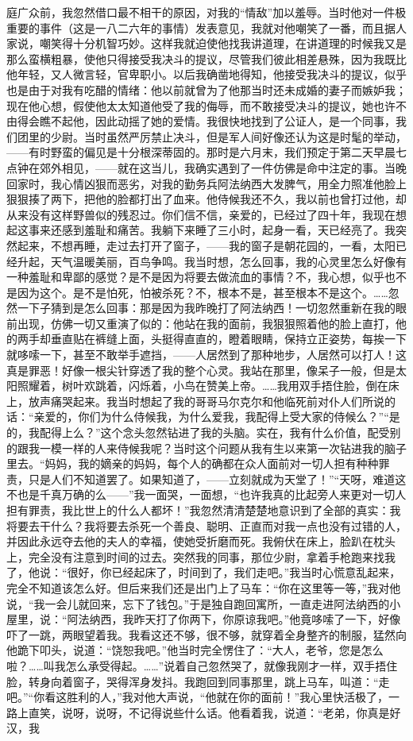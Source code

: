 庭广众前，我忽然借口最不相干的原因，对我的“情敌”加以羞辱。当时他对一件极重要的事件（这是一八二六年的事情）发表意见，我就对他嘲笑了一番，而且据人家说，嘲笑得十分机智巧妙。这样我就迫使他找我讲道理，在讲道理的时候我又是那么蛮横粗暴，使他只得接受我决斗的提议，尽管我们彼此相差悬殊，因为我既比他年轻，又人微言轻，官卑职小。以后我确凿地得知，他接受我决斗的提议，似乎也是由于对我有吃醋的情绪：他以前就曾为了他那当时还未成婚的妻子而嫉妒我；现在他心想，假使他太太知道他受了我的侮辱，而不敢接受决斗的提议，她也许不由得会瞧不起他，因此动摇了她的爱情。我很快地找到了公证人，是一个同事，我们团里的少尉。当时虽然严厉禁止决斗，但是军人间好像还认为这是时髦的举动，——有时野蛮的偏见是十分根深蒂固的。那时是六月末，我们预定于第二天早晨七点钟在郊外相见，——就在这当儿，我确实遇到了一件仿佛是命中注定的事。当晚回家时，我心情凶狠而恶劣，对我的勤务兵阿法纳西大发脾气，用全力照准他脸上狠狠揍了两下，把他的脸都打出了血来。他侍候我还不久，我以前也曾打过他，却从来没有这样野兽似的残忍过。你们信不信，亲爱的，已经过了四十年，我现在想起这事来还感到羞耻和痛苦。我躺下来睡了三小时，起身一看，天已经亮了。我突然起来，不想再睡，走过去打开了窗子，——我的窗子是朝花园的，一看，太阳已经升起，天气温暖美丽，百鸟争鸣。我当时想，怎么回事，我的心灵里怎么好像有一种羞耻和卑鄙的感觉？是不是因为将要去做流血的事情？不，我心想，似乎也不是因为这个。是不是怕死，怕被杀死？不，根本不是，甚至根本不是这个。……忽然一下子猜到是怎么回事：那是因为我昨晚打了阿法纳西！一切忽然重新在我的眼前出现，仿佛一切又重演了似的：他站在我的面前，我狠狠照着他的脸上直打，他的两手却垂直贴在裤缝上面，头挺得直直的，瞪着眼睛，保持立正姿势，每挨一下就哆嗦一下，甚至不敢举手遮挡，——人居然到了那种地步，人居然可以打人！这真是罪恶！好像一根尖针穿透了我的整个心灵。我站在那里，像呆子一般，但是太阳照耀着，树叶欢跳着，闪烁着，小鸟在赞美上帝。……我用双手捂住脸，倒在床上，放声痛哭起来。我当时想起了我的哥哥马尔克尔和他临死前对仆人们所说的话：“亲爱的，你们为什么侍候我，为什么爱我，我配得上受大家的侍候么？”“是的，我配得上么？”这个念头忽然钻进了我的头脑。实在，我有什么价值，配受别的跟我一模一样的人来侍候我呢？当时这个问题从我有生以来第一次钻进我的脑子里去。“妈妈，我的嫡亲的妈妈，每个人的确都在众人面前对一切人担有种种罪责，只是人们不知道罢了。如果知道了，——立刻就成为天堂了！”“天呀，难道这不也是千真万确的么——”我一面哭，一面想，“也许我真的比起旁人来更对一切人担有罪责，我比世上的什么人都坏！”我忽然清清楚楚地意识到了全部的真实：我将要去干什么？我将要去杀死一个善良、聪明、正直而对我一点也没有过错的人，并因此永远夺去他的夫人的幸福，使她受折磨而死。我俯伏在床上，脸趴在枕头上，完全没有注意到时间的过去。突然我的同事，那位少尉，拿着手枪跑来找我了，他说：“很好，你已经起床了，时间到了，我们走吧。”我当时心慌意乱起来，完全不知道该怎么好。但后来我们还是出门上了马车：“你在这里等一等，”我对他说，“我一会儿就回来，忘下了钱包。”于是独自跑回寓所，一直走进阿法纳西的小屋里，说：“阿法纳西，我昨天打了你两下，你原谅我吧。”他竟哆嗦了一下，好像吓了一跳，两眼望着我。我看这还不够，很不够，就穿着全身整齐的制服，猛然向他跪下叩头，说道：“饶恕我吧。”他当时完全愣住了：“大人，老爷，您是怎么啦？……叫我怎么承受得起。……”说着自己忽然哭了，就像我刚才一样，双手捂住脸，转身向着窗子，哭得浑身发抖。我跑回到同事那里，跳上马车，叫道：“走吧。”“你看这胜利的人，”我对他大声说，“他就在你的面前！”我心里快活极了，一路上直笑，说呀，说呀，不记得说些什么话。他看着我，说道：“老弟，你真是好汉，我